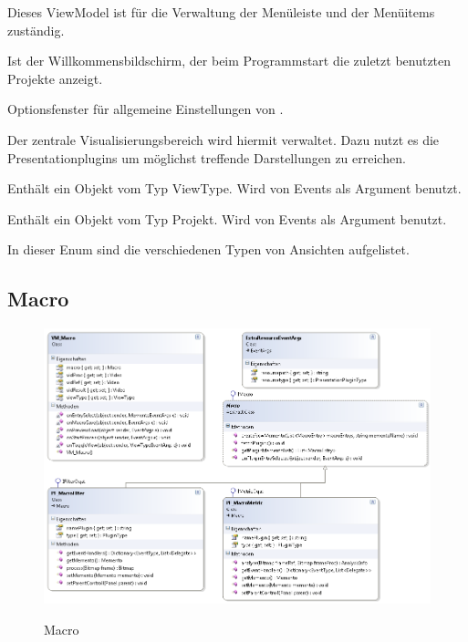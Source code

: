 Dieses ViewModel ist für die Verwaltung der Menüleiste und der Menüitems zuständig.


Ist der Willkommensbildschirm, der beim Programmstart die zuletzt benutzten Projekte anzeigt.


Optionsfenster für allgemeine Einstellungen von \projektTitel.


Der zentrale Visualisierungsbereich wird hiermit verwaltet. Dazu nutzt es die Presentationplugins um möglichst treffende Darstellungen zu erreichen.


Enthält ein Objekt vom Typ ViewType. Wird von Events als Argument benutzt.


Enthält ein Objekt vom Typ Projekt. Wird von Events als Argument benutzt.


In dieser Enum sind die verschiedenen Typen von Ansichten aufgelistet.






\pagebreak
\subsection{Macro}
\begin{figure}[h]
\noindent\includegraphics[width=\linewidth,height=\textheight,
keepaspectratio]{bilder/Klassendiagramm/Macro.png}
\label{}
\caption{Macro}
\end{figure}


